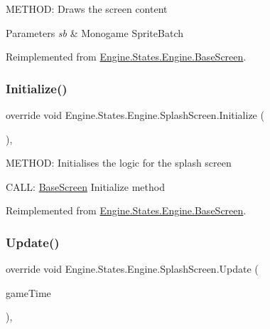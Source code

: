 M\+E\+T\+H\+OD\+: Draws the screen content 


\begin{DoxyParams}{Parameters}
{\em sb} & Monogame Sprite\+Batch\\
\hline
\end{DoxyParams}


Reimplemented from \hyperlink{a00550_a200c31954effe5fc060118607155fb16}{Engine.\+States.\+Engine.\+Base\+Screen}.

\mbox{\label{a00554_a321c34cdc158a49cf76f31e3cdd0863e}} 
\subsubsection{\texorpdfstring{Initialize()}{Initialize()}}
{\footnotesize\ttfamily override void Engine.\+States.\+Engine.\+Splash\+Screen.\+Initialize (\begin{DoxyParamCaption}{ }\end{DoxyParamCaption})\hspace{0.3cm}{\ttfamily [inline]}, {\ttfamily [virtual]}}



M\+E\+T\+H\+OD\+: Initialises the logic for the splash screen 

C\+A\+LL\+: \hyperlink{a00550}{Base\+Screen} Initialize method 

Reimplemented from \hyperlink{a00550_af8fd6890abf865641e190578ef2e054c}{Engine.\+States.\+Engine.\+Base\+Screen}.

\mbox{\label{a00554_af245506899484c6784a44550b1364b6c}} 
\subsubsection{\texorpdfstring{Update()}{Update()}}
{\footnotesize\ttfamily override void Engine.\+States.\+Engine.\+Splash\+Screen.\+Update (\begin{DoxyParamCaption}\item[{Game\+Time}]{game\+Time }\end{DoxyParamCaption})\hspace{0.3cm}{\ttfamily [inline]}, {\ttfamily [virtual]}}




